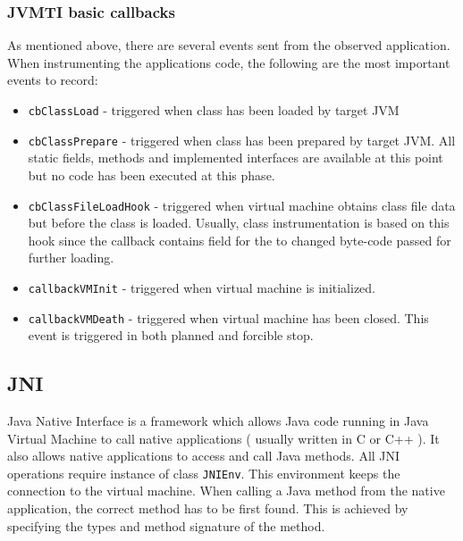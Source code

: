 \subsubsection{JVMTI basic callbacks}
As mentioned above, there are several events sent from the observed application. When instrumenting the applications code, the following are the most important events to record:
\begin{itemize}
	\item \texttt{cbClassLoad} - triggered when class has been loaded by target JVM
	\item \texttt{cbClassPrepare} - triggered when class has been prepared by target JVM. All static fields, methods and implemented interfaces are available at this point but no code has been executed at this phase.
	\item \texttt{cbClassFileLoadHook} - triggered when virtual machine obtains class file data but before the class is loaded. Usually, class instrumentation is based on this hook since the callback contains field for the to changed byte-code passed for further loading.
	\item  \texttt{callbackVMInit} - triggered when virtual machine is initialized.
	\item  \texttt{callbackVMDeath} - triggered when virtual machine has been closed. This event is triggered in both planned and forcible stop.
\end{itemize}

\subsection{JNI}
Java Native Interface is a framework which allows Java code running in Java Virtual Machine to call native applications ( usually written in C or C++ ). It also allows native applications to access and call Java methods. All JNI operations require instance of class \texttt{JNIEnv}. This environment keeps the connection to the virtual machine. When calling a Java method from the native application, the correct method has to be first found. This is achieved by specifying  the types and method signature of the method.
